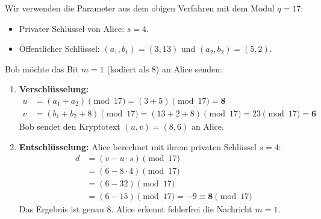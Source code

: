 \begin{myexample}[Verschlüsselung des Bits $m = 1$ mit LWE]
	Wir verwenden die Parameter aus dem obigen Verfahren mit dem Modul $q = 17$:
	\begin{itemize}
		\item Privater Schlüssel von Alice: $s = 4$.
		\item Öffentlicher Schlüssel: $(a_1, b_1) = (3, 13)$ und $(a_2, b_2) = (5, 2)$.
	\end{itemize}
	Bob möchte das Bit $m = 1$ (kodiert als $8$) an Alice senden:
	\begin{enumerate}
		\item \textbf{Verschlüsselung:}
		      \begin{align*}
			      u & = (a_1 + a_2) \pmod{17} = (3 + 5) \pmod{17} = \mathbf{8} \\
			      v & = (b_1 + b_2 + 8) \pmod{17} = (13 + 2 + 8) \pmod{17} = 23 \pmod{17} = \mathbf{6}
		      \end{align*}
		      Bob sendet den Kryptotext $(u, v) = (8, 6)$ an Alice.
		\item \textbf{Entschlüsselung:} Alice berechnet mit ihrem privaten Schlüssel $s = 4$:
		      \begin{align*}
			      d & = (v - u \cdot s) \pmod{17} \\
			        & = (6 - 8 \cdot 4) \pmod{17} \\
			        & = (6 - 32) \pmod{17} \\
			        & = (6 - 15) \pmod{17} = -9 \equiv \mathbf{8} \pmod{17}
		      \end{align*}
		      Das Ergebnis ist genau $8$. Alice erkennt fehlerfrei die Nachricht $m = 1$.
	\end{enumerate}
\end{myexample}

